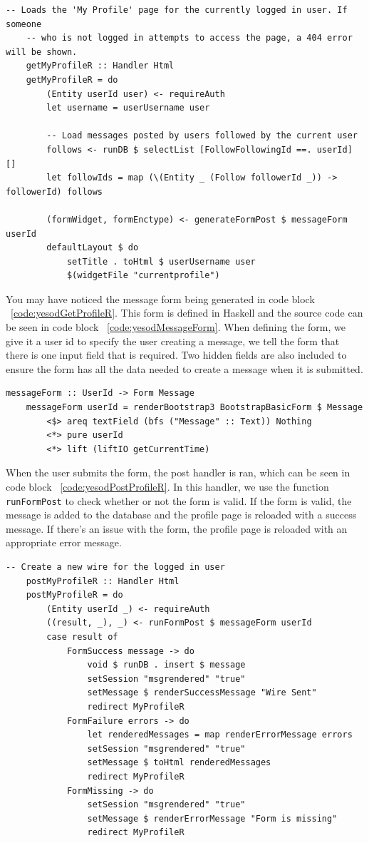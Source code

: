 \begin{lstlisting}[caption={GET request handler for current profile page},label={code:yesodGetProfileR}]
	-- Loads the 'My Profile' page for the currently logged in user. If someone
	-- who is not logged in attempts to access the page, a 404 error will be shown.
	getMyProfileR :: Handler Html
	getMyProfileR = do
		(Entity userId user) <- requireAuth
		let username = userUsername user
	
		-- Load messages posted by users followed by the current user
		follows <- runDB $ selectList [FollowFollowingId ==. userId] []
		let followIds = map (\(Entity _ (Follow followerId _)) -> followerId) follows
	
		(formWidget, formEnctype) <- generateFormPost $ messageForm userId
		defaultLayout $ do
			setTitle . toHtml $ userUsername user
			$(widgetFile "currentprofile")
\end{lstlisting}

You may have noticed the message form being generated in code block ~\ref{code:yesodGetProfileR}.
This form is defined in Haskell and the source code can be seen in code block ~\ref{code:yesodMessageForm}.
When defining the form, we give it a user id to specify the user creating a message, 
we tell the form that there is one input field that is required. Two hidden fields
are also included to ensure the form has all the data needed to create a message
when it is submitted.

\begin{lstlisting}[caption={The message form},label={code:yesodMessageForm}]
	messageForm :: UserId -> Form Message
	messageForm userId = renderBootstrap3 BootstrapBasicForm $ Message
		<$> areq textField (bfs ("Message" :: Text)) Nothing
		<*> pure userId
		<*> lift (liftIO getCurrentTime)
\end{lstlisting}

When the user submits the form, the post handler is ran, which can be seen in code block
~\ref{code:yesodPostProfileR}. In this handler, we use the function \texttt{runFormPost}
to check whether or not the form is valid. If the form is valid, the message is added
to the database and the profile page is reloaded with a success message. If there's an
issue with the form, the profile page is reloaded with an appropriate error message.

\begin{lstlisting}[caption={POST request handler for current profile page},label={code:yesodPostProfileR}]
	-- Create a new wire for the logged in user
	postMyProfileR :: Handler Html
	postMyProfileR = do
		(Entity userId _) <- requireAuth
		((result, _), _) <- runFormPost $ messageForm userId
		case result of
			FormSuccess message -> do
				void $ runDB . insert $ message
				setSession "msgrendered" "true"
				setMessage $ renderSuccessMessage "Wire Sent"
				redirect MyProfileR
			FormFailure errors -> do
				let renderedMessages = map renderErrorMessage errors
				setSession "msgrendered" "true"
				setMessage $ toHtml renderedMessages
				redirect MyProfileR
			FormMissing -> do
				setSession "msgrendered" "true"
				setMessage $ renderErrorMessage "Form is missing"
				redirect MyProfileR
\end{lstlisting}

